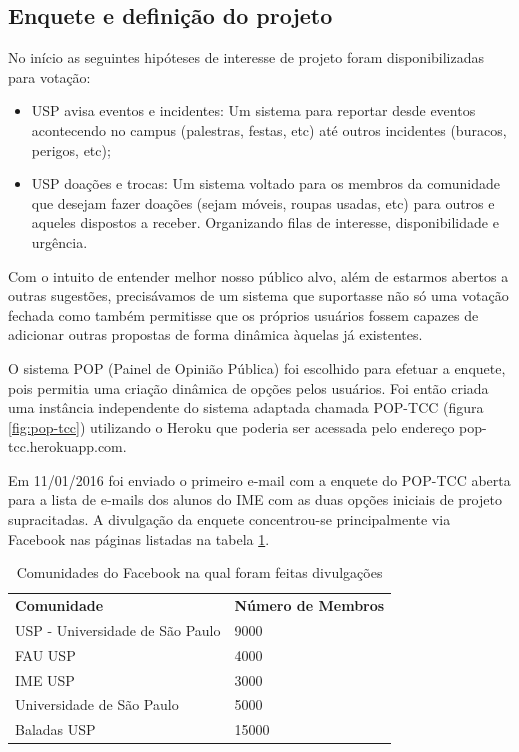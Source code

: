 \subsection{Enquete e definição do projeto}
        \par  No início as seguintes hipóteses de interesse de projeto foram disponibilizadas para votação:
                \begin{itemize}
                \item {USP avisa eventos e incidentes:} Um sistema para reportar desde eventos acontecendo no campus (palestras, festas, etc) até outros incidentes (buracos, perigos, etc);
                \item {USP doações e trocas: } Um sistema voltado para os membros da comunidade que desejam fazer doações (sejam móveis, roupas usadas, etc) para outros e aqueles dispostos a receber. Organizando filas de interesse, disponibilidade e urgência.
                \end{itemize}
        \par Com o intuito de entender melhor nosso público alvo, além de estarmos abertos a outras sugestões, precisávamos de um sistema que suportasse não só uma votação fechada como também permitisse que os próprios usuários fossem capazes de adicionar outras propostas de forma dinâmica àquelas já existentes.
        \par O sistema POP (Painel de Opinião Pública) foi escolhido para efetuar a enquete, pois permitia uma criação dinâmica de opções pelos usuários. Foi então criada uma instância independente do sistema adaptada chamada POP-TCC (figura \ref{fig:pop-tcc}) utilizando o Heroku que poderia ser acessada pelo endereço pop-tcc.herokuapp.com.
        \par Em 11/01/2016 foi enviado o primeiro e-mail com a enquete do POP-TCC aberta para a lista de e-mails dos alunos do IME com as duas opções iniciais de projeto supracitadas. A divulgação da enquete concentrou-se principalmente via Facebook nas páginas listadas na tabela \ref{tabela-paginas}.
\begin{table}[]
\centering
\caption{Comunidades do Facebook na qual foram feitas divulgações}
\label{tabela-paginas}
\begin{tabular}{ll}
{\color[HTML]{3531FF} \textbf{Comunidade}} & {\color[HTML]{3531FF} \textbf{Número de Membros}} \\
USP - Universidade de São Paulo            & 9000                                               \\
FAU USP                                    & 4000                                              \\
IME USP                                    & 3000                                              \\
Universidade de São Paulo                  & 5000                                              \\
Baladas USP                                & 15000
\end{tabular}
\end{table}
